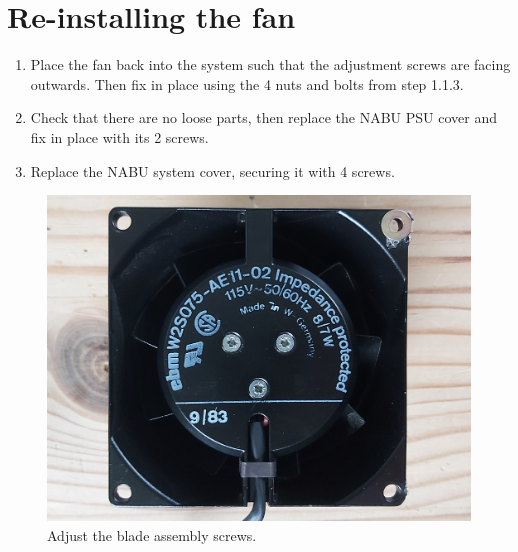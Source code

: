 \section{Re-installing the fan}
\begin{enumerate}
	\item Place the fan back into the system such that the adjustment screws are facing outwards. Then fix in place using the 4 nuts and bolts from step 1.1.3.
	\item Check that there are no loose parts, then replace the NABU PSU cover and fix in place with its 2 screws.
	\item Replace the NABU system cover, securing it with 4 screws.
\end{enumerate}
\newpage
\begin{figure}[h!]
	\includegraphics[width=\columnwidth]{images/fan-image-1.jpg}
	\caption{Adjust the blade assembly screws.}
	\label{fig:fanassembly}
\end{figure}
